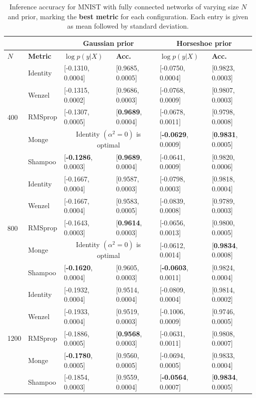 \documentclass[10pt]{article} %
\theoremstyle{plain}
\theoremstyle{definition}
\theoremstyle{remark}
\begin{document}
\begin{table}[t]
\begin{center}
\begin{tabular}{ll|ll|ll}
 & & \multicolumn{2}{c}{Gaussian prior} &
 \multicolumn{2}{c}{Horseshoe prior} \\
\hline
$N$ & {\bf Metric}                   & $\log p(y|X)$  & {\bf Acc.}
& $\log p(y|X)$  & {\bf Acc.}        \\
\hline
\multirow{5}{1em}{400} & 
Identity & 
[-0.1310, 0.0004]  & [0.9685, 0.0005] &
[-0.0750, 0.0004]  & [0.9823, 0.0003] \\
& Wenzel  & 
[-0.1315, 0.0002] & [0.9686, 0.0003] &
[-0.0768, 0.0009] & [0.9807, 0.0003] \\
& RMSprop &
[-0.1307, 0.0005] & [{\bf 0.9689}, 0.0004] & 
[-0.0678, 0.0011] & [0.9798, 0.0008] \\
& Monge   &
\multicolumn{2}{c|}{Identity $(\alpha^{2}=0)$ is optimal} &
[{\bf -0.0629}, 0.0009] & [{\bf 0.9831}, 0.0005] \\
& Shampoo &
[{\bf -0.1286}, 0.0003] & [{\bf 0.9689}, 0.0004] &
[-0.0641, 0.0009] & [0.9820, 0.0006] \\
\hline
\multirow{5}{1em}{800} & 
Identity & 
[-0.1667, 0.0004] & [0.9587, 0.0003] &
[-0.0798, 0.0003] & [0.9818, 0.0004] \\
& Wenzel  & 
[-0.1667, 0.0004] & [0.9583, 0.0005] &
[-0.0839, 0.0008] & [0.9789, 0.0003] \\
& RMSprop &
[-0.1643, 0.0003] & [{\bf 0.9614}, 0.0003] &
[-0.0656, 0.0013] & [0.9800, 0.0005] \\
& Monge   &
\multicolumn{2}{c|}{Identity $(\alpha^{2}=0)$ is optimal} &
[-0.0612, 0.0014] & [{\bf 0.9834}, 0.0008] \\
& Shampoo &
[{\bf -0.1620}, 0.0004] & [0.9605, 0.0003] &
[{\bf -0.0603}, 0.0011] & [0.9824, 0.0004] \\
\hline
\multirow{5}{1em}{1200} & 
Identity & 
[-0.1932, 0.0004] & [0.9514, 0.0004] &
[-0.0809, 0.0004] & [0.9814, 0.0002] \\
& Wenzel & 
[-0.1933, 0.0004] & [0.9519, 0.0003] &
[-0.1006, 0.0009] & [0.9746, 0.0005] \\
& RMSprop &
[-0.1886, 0.0005] & [{\bf 0.9568}, 0.0003] &
[-0.0631, 0.0011] & [0.9808, 0.0007] \\
& Monge   &
[{\bf -0.1780}, 0.0005] & [0.9560, 0.0005] &
[-0.0694, 0.0005] & [0.9833, 0.0004] \\
& Shampoo &
[-0.1854, 0.0003] & [0.9559, 0.0004] &
[{\bf -0.0564}, 0.0007] & [{\bf 0.9834}, 0.0005] \\
\hline
\end{tabular}
\caption{Inference accuracy for MNIST with fully connected networks of varying size $N$ and prior, marking the {\bf best metric} for each configuration. Each entry is given as mean followed by standard deviation.}
\label{table:mnist1}
\end{center}
\end{table}
\end{document}
